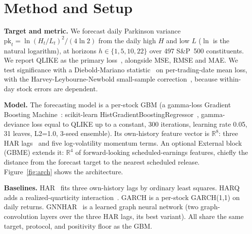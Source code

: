 \documentclass{llncs}
\begin{document}
\section{Method and Setup}
\textbf{Target and metric.} We forecast daily Parkinson variance
$\mathrm{pk}_t=\ln(H_t/L_t)^2/(4\ln 2)$ from the daily high $H$ and low $L$ ($\ln$ is the natural
logarithm), at horizons $h\in\{1,5,10,22\}$ over 497 S\&P~500 constituents. We report QLIKE as the
primary loss~\cite{patton2011}, alongside MSE, RMSE and MAE. We test significance with a
Diebold-Mariano statistic~\cite{dm1995} on per-trading-date mean loss, with the
Harvey-Leybourne-Newbold small-sample correction~\cite{hln1997}, because within-day stock errors are
dependent.

\textbf{Model.} The forecasting model is a per-stock GBM (a gamma-loss Gradient Boosting
Machine~\cite{friedman2001}: scikit-learn HistGradientBoostingRegressor~\cite{pedregosa2011},
gamma-deviance loss equal to QLIKE up to a constant, 300 iterations, learning rate 0.05, 31 leaves,
L2=1.0, 3-seed ensemble). Its own-history feature vector is $\mathbb{R}^8$: three HAR
lags~\cite{corsi2009} and five log-volatility momentum terms. An
optional External block (GBME) extends it: $\mathbb{R}^4$ of forward-looking scheduled-earnings
features, chiefly the distance from the forecast target to the nearest scheduled release.
Figure~\ref{fig:arch} shows the architecture.

\textbf{Baselines.} HAR~\cite{corsi2009} fits three own-history lags by ordinary least squares. HARQ
adds a realized-quarticity interaction~\cite{harq2016}. GARCH is a per-stock GARCH(1,1) on daily
returns. GNNHAR~\cite{gnnhar2024} is a learned graph neural network (two graph-convolution layers over
the three HAR lags, its best variant). All share the same target, protocol, and positivity floor as
the GBM.
\end{document}
